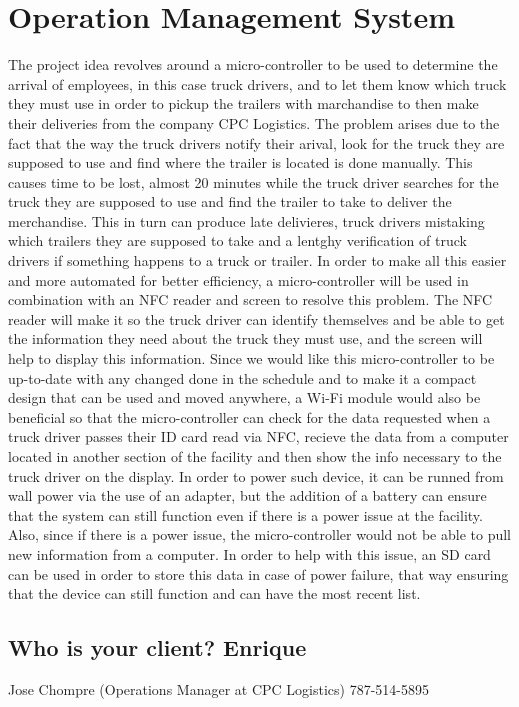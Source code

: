 \chapter{Operation Management System}
The project idea revolves around a micro-controller to be used to determine the arrival of employees, in this case truck drivers, and to let them know which truck they must use in order to pickup the trailers with marchandise to then make their deliveries from the company CPC Logistics. The problem arises due to the fact that the way the truck drivers notify their arival, look for the truck they are supposed to use and find where the trailer is located is done manually. This causes time to be lost, almost 20 minutes while the truck driver searches for the truck they are supposed to use and find the trailer to take to deliver the merchandise. This in turn can produce late delivieres, truck drivers mistaking which trailers they are supposed to take and a lentghy verification of truck drivers if something happens to a truck or trailer. In order to make all this easier and more automated for better efficiency, a micro-controller will be used in combination with an NFC reader and screen to resolve this problem. The NFC reader will make it so the truck driver can identify themselves and be able to get the information they need about the truck they must use, and the screen will help to display this information. Since we would like this micro-controller to be up-to-date with any changed done in the schedule and to make it a compact design that can be used and moved anywhere, a Wi-Fi module would also be beneficial so that the micro-controller can check for the data requested when a truck driver passes their ID card read via NFC, recieve the data from a computer located in another section of the facility and then show the info necessary to the truck driver on the display. In order to power such device, it can be runned from wall power via the use of an adapter, but the addition of a battery can ensure that the system can still function even if there is a power issue at the facility. Also, since if there is a power issue, the micro-controller would not be able to pull new information from a computer. In order to help with this issue, an SD card can be used in order to store this data in case of power failure, that way ensuring that the device can still function and can have the most recent list. 
\newpage
\section{Who is your client? Enrique}
Jose Chompre (Operations Manager at CPC Logistics) 787-514-5895